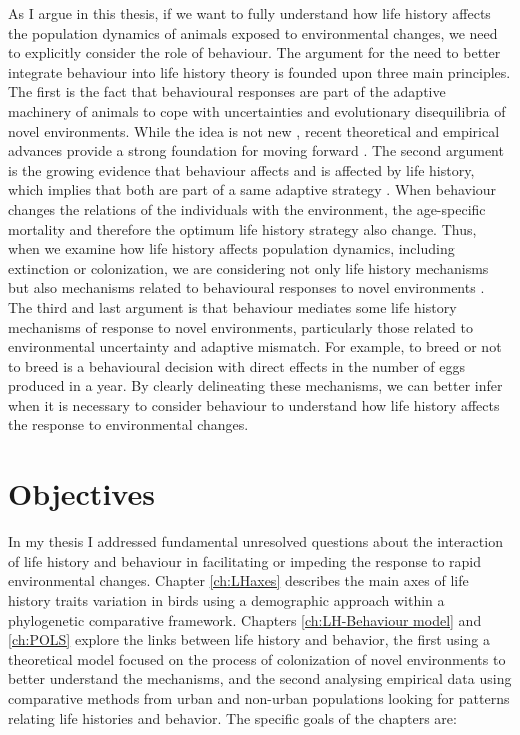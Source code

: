 As I argue in this thesis, if we want to fully understand how life history
affects the population dynamics of animals exposed to environmental changes, we
need to explicitly consider the role of behaviour. The argument for the need
to better integrate behaviour into life history theory is founded upon three
main principles.
The first is the fact that behavioural responses are part of the adaptive
machinery of animals to cope with uncertainties and evolutionary disequilibria
of novel environments. While the idea is not new \citep{mayr1965}, recent
theoretical and empirical advances provide a strong foundation for moving
forward \citep{Sol2020, Ducatez2020}.
The second argument is the growing evidence that behaviour affects and is
affected by life history, which implies that both are part of a same adaptive
strategy \citep{Ricklefs2002,Reale2010a,Sol2016,Sol2016a}. When behaviour
changes the relations of the individuals with the environment, the age-specific
mortality and therefore the optimum life history strategy also change. Thus,
when we examine how life history affects population dynamics, including
extinction or colonization, we are considering not only life history mechanisms
but also mechanisms related to behavioural responses to novel environments
\citep{Sol2016}.
The third and last argument is that behaviour mediates some life history
mechanisms of response to novel environments, particularly those related to
environmental uncertainty and adaptive mismatch. For example, to breed or not
to breed is a behavioural decision with direct effects in the number of eggs
produced in a year.
By clearly delineating these mechanisms, we can better infer when it is
necessary to consider behaviour to understand how life history affects the
response to environmental changes.


\section{Objectives}

In my thesis I addressed fundamental unresolved questions about the 
interaction of life history and behaviour in facilitating or impeding the 
response to rapid environmental changes. Chapter \ref{ch:LHaxes} describes the 
main axes of life history traits variation in birds using a demographic
approach within a phylogenetic comparative framework. Chapters
\ref{ch:LH-Behaviour model} and \ref{ch:POLS} explore the links between life
history and behavior, the first using a theoretical model focused on the process
of colonization of novel environments to better understand the mechanisms, and
the second analysing empirical data using comparative methods from urban and
non-urban populations looking for patterns relating life histories and behavior.
The specific goals of the chapters are:



